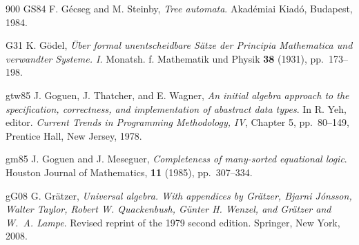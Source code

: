\begin{thebibliography}{900}
\bibitem%
{GS84} F. G\'{e}cseg and M. Steinby, \emph{Tree automata}. Akad\'{e}miai Kiad\'{o}, Budapest, 1984.



\bibitem%
{G31} K. G\"{o}del, \emph{\"{U}ber formal unentscheidbare S\"{a}tze der Principia Mathematica und verwandter Systeme. I.} 
Monatsh. f. Mathematik und Physik \textbf{38} (1931), pp.~173--198.

\bibitem%
{gtw85} J. Goguen, J. Thatcher, and E. Wagner, \emph{An initial algebra approach to the specification, correctness, and implementation of abastract data types}. In R. Yeh, editor. \emph{Current Trends in Programming Methodology, IV}, Chapter 5, pp.~80--149, Prentice Hall, New Jersey, 1978.

\bibitem%
{gm85} J. Goguen and J. Meseguer, \emph{Completeness of many-sorted equational logic}. Houston Journal of Mathematics, \textbf{11} (1985), pp.~307--334.



\bibitem%
{gG08} G. Gr\"{a}tzer, \emph{Universal algebra. With appendices by Gr\"{a}tzer, Bjarni J\'{o}nsson, Walter Taylor, Robert W. Quackenbush, G\"{u}nter H. Wenzel, and Gr\"{a}tzer and W.~A. Lampe}. Revised reprint of the 1979 second edition. Springer, New York, 2008.




\end{thebibliography}
